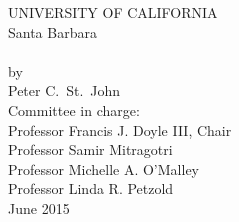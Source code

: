 \thispagestyle{empty}
\begin{center}
  UNIVERSITY OF CALIFORNIA\\
  Santa Barbara\\
  \vfil
  {\Large\thetitle}\\
  \vfil
  by\\
  \vfil
  {\large Peter C.\ St.\ John}\\
  \vfil
  Committee in charge:\\
  Professor Francis J. Doyle III, Chair\\
  Professor Samir Mitragotri\\
  Professor Michelle A. O'Malley\\
  Professor Linda R. Petzold\\
  \vfil
  June 2015
\end{center}
